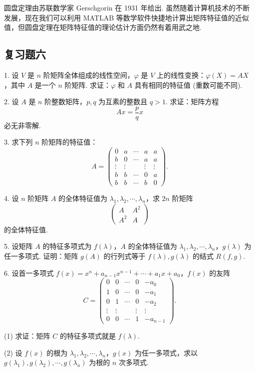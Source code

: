 \documentclass[UTF8,12pt,a4paper,fontset=fandol]{ctexart}
\begin{document}
圆盘定理由苏联数学家 Gerschgorin 在 1931 年给出. 虽然随着计算机技术的不断发展，现在我们可以利用 MATLAB 等数学软件快捷地计算出矩阵特征值的近似值，但圆盘定理在矩阵特征值的理论估计方面仍然有着用武之地.

\subsection*{复习题六}

1. 设 $V$ 是 $n$ 阶矩阵全体组成的线性空间，$\varphi$ 是 $V$ 上的线性变换：$\varphi(X)=AX$，其中 $A$ 是一个 $n$ 阶矩阵. 求证：$\varphi$ 和 $A$ 具有相同的特征值 (重数可能不同).

2. 设 $A$ 是 $n$ 阶整数矩阵，$p,q$ 为互素的整数且 $q>1$. 求证：矩阵方程
\[
Ax=\frac{p}{q}x
\]
必无非零解.

3. 求下列 $n$ 阶矩阵的特征值：
\[
A=\left(\begin{array}{ccccc}
0 & a & \cdots & a & a\\
b & 0 & \cdots & a & a\\
\vdots & \vdots & & \vdots & \vdots\\
b & b & \cdots & 0 & a\\
b & b & \cdots & b & 0
\end{array}\right).
\]

4. 设 $n$ 阶矩阵 $A$ 的全体特征值为 $\lambda_1,\lambda_2,\cdots,\lambda_n$，求 $2n$ 阶矩阵
\[
\left(\begin{array}{cc}
A & A^2\\
A^2 & A
\end{array}\right)
\]
的全体特征值.

5. 设矩阵 $A$ 的特征多项式为 $f(\lambda)$，$A$ 的全体特征值为 $\lambda_1,\lambda_2,\cdots,\lambda_n$，$g(\lambda)$ 为任一多项式. 证明：矩阵 $g(A)$ 的行列式等于 $f(\lambda),g(\lambda)$ 的结式 $R(f,g)$.

6. 设首一多项式 $f(x)=x^n+a_{n-1}x^{n-1}+\cdots+a_1x+a_0$，$f(x)$ 的友阵
\[
C=\left(\begin{array}{ccccc}
0 & 0 & \cdots & 0 & -a_0\\
1 & 0 & \cdots & 0 & -a_1\\
0 & 1 & \cdots & 0 & -a_2\\
\vdots & \vdots & & \vdots & \vdots\\
0 & 0 & \cdots & 1 & -a_{n-1}
\end{array}\right).
\]

(1) 求证：矩阵 $C$ 的特征多项式就是 $f(\lambda)$.

(2) 设 $f(x)$ 的根为 $\lambda_1,\lambda_2,\cdots,\lambda_n$，$g(x)$ 为任一多项式，求以 $g(\lambda_1),g(\lambda_2),\cdots,g(\lambda_n)$ 为根的 $n$ 次多项式.
\end{document}
